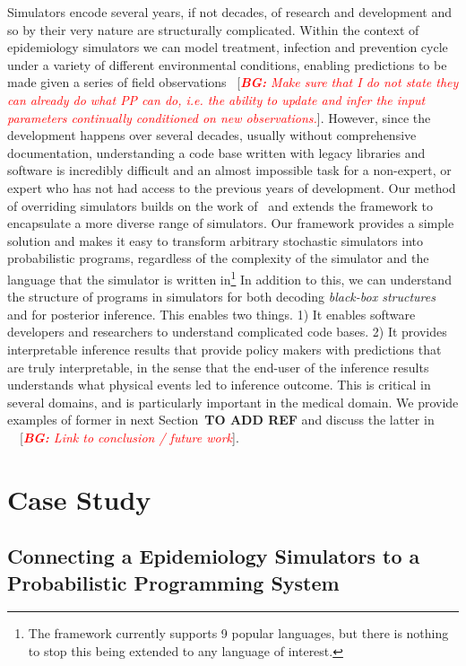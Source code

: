 \documentclass{article}
\newcommand{\bg}[1]{~{{[{\it \textcolor{red}{{\bf BG:} #1}}]}}}
\begin{document}
Simulators encode several years, if not decades, of research and development and so by their very nature are structurally complicated. 
Within the context of epidemiology simulators we can model treatment, infection and prevention cycle under a variety of different environmental conditions, enabling predictions to be made given a series of field observations \bg{Make sure that I do not state they can already do what PP can do, i.e. the ability to update and infer the input parameters continually conditioned on new observations.}. 
However, since the development happens over several decades, usually without comprehensive documentation, understanding a code base written with legacy libraries and software is incredibly difficult and an almost impossible task for a non-expert, or expert who has not had access to the previous years of development. 
Our method of overriding simulators builds on the work of~\cite{baydin2018efficient} and extends the framework to encapsulate a more diverse range of simulators. 
Our framework provides a simple solution and makes it easy to transform arbitrary stochastic simulators into probabilistic programs, regardless of the complexity of the simulator and the language that the simulator is written in\footnote{The framework currently supports 9 popular languages, but there is nothing to stop this being extended to any language of interest.}
In addition to this, we can understand the structure of programs in simulators for both decoding \emph{black-box structures} and for posterior inference. 
This enables two things. 1) It enables software developers and researchers to understand complicated code bases. 
2) It provides interpretable inference results that provide policy makers with predictions that are truly interpretable, in the sense that the end-user of the inference results understands what physical events led to inference outcome. 
This is critical in several domains, and is particularly important in the medical domain. 
We provide examples of former in next Section~\textbf{TO ADD REF} and discuss the latter in ~\bg{Link to conclusion / future work}.


\section{Case Study}
\subsection{Connecting a Epidemiology Simulators to a Probabilistic Programming System}
\end{document}

